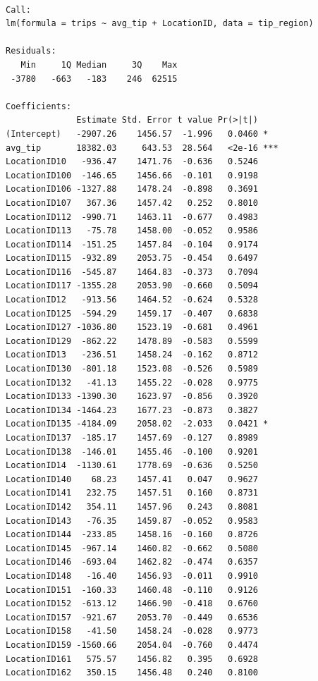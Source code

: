 \documentclass[12pt,twoside]{reedthesis}
\theoremstyle{definition}
\theoremstyle{definition}
\theoremstyle{definition}
\theoremstyle{remark}
\begin{document}
\begin{verbatim}

Call:
lm(formula = trips ~ avg_tip + LocationID, data = tip_region)

Residuals:
   Min     1Q Median     3Q    Max 
 -3780   -663   -183    246  62515 

Coefficients:
              Estimate Std. Error t value Pr(>|t|)    
(Intercept)   -2907.26    1456.57  -1.996   0.0460 *  
avg_tip       18382.03     643.53  28.564   <2e-16 ***
LocationID10   -936.47    1471.76  -0.636   0.5246    
LocationID100  -146.65    1456.66  -0.101   0.9198    
LocationID106 -1327.88    1478.24  -0.898   0.3691    
LocationID107   367.36    1457.42   0.252   0.8010    
LocationID112  -990.71    1463.11  -0.677   0.4983    
LocationID113   -75.78    1458.00  -0.052   0.9586    
LocationID114  -151.25    1457.84  -0.104   0.9174    
LocationID115  -932.89    2053.75  -0.454   0.6497    
LocationID116  -545.87    1464.83  -0.373   0.7094    
LocationID117 -1355.28    2053.90  -0.660   0.5094    
LocationID12   -913.56    1464.52  -0.624   0.5328    
LocationID125  -594.29    1459.17  -0.407   0.6838    
LocationID127 -1036.80    1523.19  -0.681   0.4961    
LocationID129  -862.22    1478.89  -0.583   0.5599    
LocationID13   -236.51    1458.24  -0.162   0.8712    
LocationID130  -801.18    1523.08  -0.526   0.5989    
LocationID132   -41.13    1455.22  -0.028   0.9775    
LocationID133 -1390.30    1623.97  -0.856   0.3920    
LocationID134 -1464.23    1677.23  -0.873   0.3827    
LocationID135 -4184.09    2058.02  -2.033   0.0421 *  
LocationID137  -185.17    1457.69  -0.127   0.8989    
LocationID138  -146.01    1455.46  -0.100   0.9201    
LocationID14  -1130.61    1778.69  -0.636   0.5250    
LocationID140    68.23    1457.41   0.047   0.9627    
LocationID141   232.75    1457.51   0.160   0.8731    
LocationID142   354.11    1457.96   0.243   0.8081    
LocationID143   -76.35    1459.87  -0.052   0.9583    
LocationID144  -233.85    1458.16  -0.160   0.8726    
LocationID145  -967.14    1460.82  -0.662   0.5080    
LocationID146  -693.04    1462.82  -0.474   0.6357    
LocationID148   -16.40    1456.93  -0.011   0.9910    
LocationID151  -160.33    1460.48  -0.110   0.9126    
LocationID152  -613.12    1466.90  -0.418   0.6760    
LocationID157  -921.67    2053.70  -0.449   0.6536    
LocationID158   -41.50    1458.24  -0.028   0.9773    
LocationID159 -1560.66    2054.04  -0.760   0.4474    
LocationID161   575.57    1456.82   0.395   0.6928    
LocationID162   350.15    1456.48   0.240   0.8100    

\end{verbatim}
\end{document}
